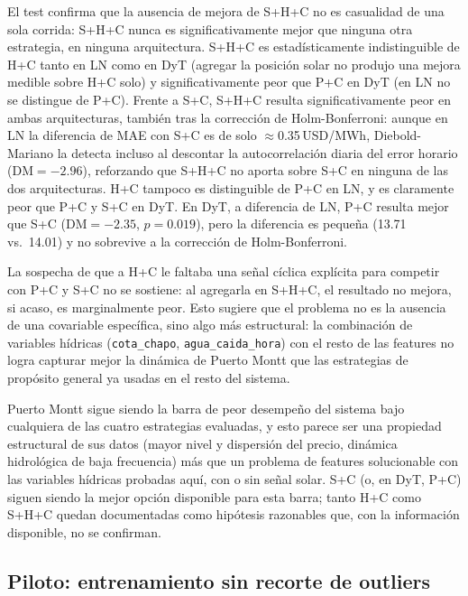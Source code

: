 El test confirma que la ausencia de mejora de S+H+C no es casualidad de una sola corrida: S+H+C nunca es significativamente mejor que ninguna otra estrategia, en ninguna arquitectura. S+H+C es estadísticamente indistinguible de H+C tanto en LN como en DyT (agregar la posición solar no produjo una mejora medible sobre H+C solo) y significativamente peor que P+C en DyT (en LN no se distingue de P+C). Frente a S+C, S+H+C resulta significativamente peor en ambas arquitecturas, también tras la corrección de Holm-Bonferroni: aunque en LN la diferencia de MAE con S+C es de solo $\approx$0.35\,USD/MWh, Diebold-Mariano la detecta incluso al descontar la autocorrelación diaria del error horario (DM$=-2.96$), reforzando que S+H+C no aporta sobre S+C en ninguna de las dos arquitecturas. H+C tampoco es distinguible de P+C en LN, y es claramente peor que P+C y S+C en DyT. En DyT, a diferencia de LN, P+C resulta mejor que S+C (DM$=-2.35$, $p=0.019$), pero la diferencia es pequeña (13.71 vs.\ 14.01) y no sobrevive a la corrección de Holm-Bonferroni.

La sospecha de que a H+C le faltaba una señal cíclica explícita para competir con P+C y S+C no se sostiene: al agregarla en S+H+C, el resultado no mejora, si acaso, es marginalmente peor. Esto sugiere que el problema no es la ausencia de una covariable específica, sino algo más estructural: la combinación de variables hídricas (\texttt{cota\_chapo}, \texttt{agua\_caida\_hora}) con el resto de las features no logra capturar mejor la dinámica de Puerto Montt que las estrategias de propósito general ya usadas en el resto del sistema.

Puerto Montt sigue siendo la barra de peor desempeño del sistema bajo cualquiera de las cuatro estrategias evaluadas, y esto parece ser una propiedad estructural de sus datos (mayor nivel y dispersión del precio, dinámica hidrológica de baja frecuencia) más que un problema de features solucionable con las variables hídricas probadas aquí, con o sin señal solar. S+C (o, en DyT, P+C) siguen siendo la mejor opción disponible para esta barra; tanto H+C como S+H+C quedan documentadas como hipótesis razonables que, con la información disponible, no se confirman.

\subsection{Piloto: entrenamiento sin recorte de outliers}
\label{sec:piloto_outliers}

